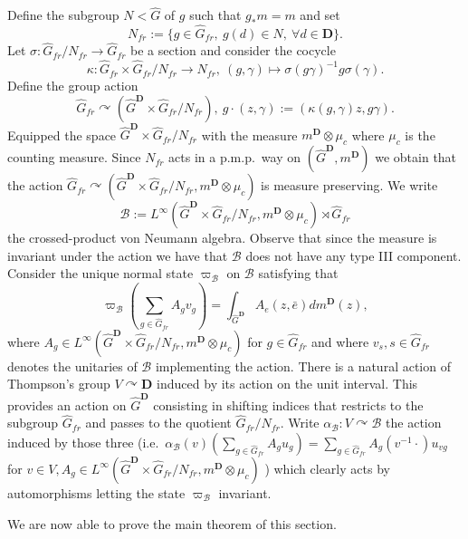\documentclass[a4paper,12pt]{amsart}
\numberwithin{equation}{section}
\theoremstyle{definition}
\newcommand{\act}{\curvearrowright}
\newcommand{\al}{\alpha}
\newcommand{\scrB}{\mathscr B}
\newcommand{\D}{\mathbf D}
\newcommand{\ga}{\gamma}
\newcommand{\ot}{\otimes}\newcommand{\otmin}{\otimes_{\text{min}}}
\newcommand{\wh}{\widehat}
\begin{document}
Define the subgroup $N<\wh G$ of $g$ such that $g_*m=m$ and set 
$$N_{fr}:=\{g\in \wh G_{fr},\ g(d)\in N, \ \forall d\in\D\}.$$
Let $\sigma:\wh G_{fr}/N_{fr}\to \wh G_{fr}$ be a section and consider the cocycle 
$$\kappa: \wh G_{fr}\times \wh G_{fr}/N_{fr}\to N_{fr}, \ (g,\ga)\mapsto \sigma(g\ga)^{-1} g \sigma(\ga).$$
Define the group action 
\begin{equation}\label{equa:GrX} \wh G_{fr}\act ({\wh G}^\D \times \wh G_{fr}/N_{fr}), \ g\cdot (z, \ga) := (\kappa(g,\ga) z , g \ga).\end{equation}
Equipped the space ${\wh G}^\D \times \wh G_{fr}/N_{fr}$ with the measure $m^\D\ot \mu_c$ where $\mu_c$ is the counting measure.
Since $N_{fr}$ acts in a p.m.p.~way on $({\wh G}^\D,m^\D)$ we obtain that the action $\wh G_{fr}\act ({\wh G}^\D \times \wh G_{fr}/N_{fr} , m^\D\ot \mu_c)$ is measure preserving.
We write $$\mathscr B:= L^\infty({\wh G}^\D\times \wh G_{fr}/N_{fr}, m^\D\ot \mu_c)\rtimes \wh G_{fr}$$ the crossed-product von Neumann algebra. 
Observe that since the measure is invariant under the action we have that $\scrB$ does not have any type III component.
Consider the unique normal state $\varpi_\mathscr B$ on $\mathscr B$ satisfying that 
$$\varpi_\scrB (\sum_{g\in \wh G_{fr}} A_g v_g) = \int_{ {\wh G}^\D } A_e(z, \bar e) dm^\D(z),$$
where $A_g\in L^\infty({\wh G}^\D\times \wh G_{fr}/N_{fr}, m^\D\ot \mu_c)$ for $g\in\wh G_{fr}$ and where $v_s, s\in \wh G_{fr}$ denotes the unitaries of $\mathscr B$ implementing the action.
There is a natural action of Thompson's group $V\act \D$ induced by its action on the unit interval.
This provides an action on $\wh G^\D$ consisting in shifting indices that restricts to the subgroup $\wh G_{fr}$ and passes to the quotient $\wh G_{fr}/ N_{fr}.$
Write $\al_\mathscr B:V\act \mathscr B$ the action induced by those three (i.e.~$\al_\scrB(v)\left(\sum_{g\in\wh G_{fr}} A_g u_g\right) = \sum_{g\in\wh G_{fr}} A_g(v^{-1} \cdot ) u_{vg}$ for $v\in V, A_g\in L^\infty({\wh G}^\D\times \wh G_{fr}/N_{fr}, m^\D\ot \mu_c)$ ) which clearly acts by automorphisms letting the state $\varpi_\mathscr B$ invariant.

We are now able to prove the main theorem of this section.
\end{document}
